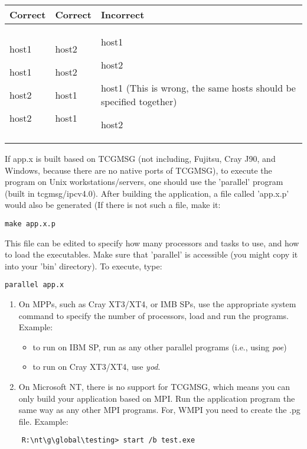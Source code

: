 \begin{tabular}{|>{\centering}p{2cm}|>{\centering}p{2cm}|>{\raggedright}p{3cm}|}
\hline 
Correct & Correct & Incorrect\tabularnewline
\hline
\hline 
host1

host1

host2

host2 & host2

host2

host1

host1 & host1

host2

host1 (This is wrong, the same hosts should be specified together)

host2\tabularnewline
\hline
\end{tabular}

If app.x is built based on TCGMSG (not including, Fujitsu, Cray J90,
and Windows, because there are no native ports of TCGMSG), to execute
the program on Unix workstations/servers, one should use the 'parallel'
program (built in tcgmsg/ipcv4.0). After building the application,
a file called 'app.x.p' would also be generated (If there is not such
a file, make it: 
\begin{verbatim}
make app.x.p
\end{verbatim}
This file can be edited to specify how many processors and tasks to
use, and how to load the executables. Make sure that 'parallel' is
accessible (you might copy it into your 'bin' directory). To execute,
type:
\begin{verbatim}
parallel app.x
\end{verbatim}
\begin{enumerate}
\item On MPPs, such as Cray XT3/XT4, or IMB SPs, use the appropriate system
command to specify the number of processors, load and run the programs.
Example: 

\begin{itemize}
\item to run on IBM SP, run as any other parallel programs (i.e., using
\emph{poe}) 
\item to run on Cray XT3/XT4, use \emph{yod}.
\end{itemize}
\item On Microsoft NT, there is no support for TCGMSG, which means you can
only build your application based on MPI. Run the application program
the same way as any other MPI programs. For, WMPI you need to create
the .pg file. Example: \end{enumerate}
\begin{verbatim}
    R:\nt\g\global\testing> start /b test.exe
\end{verbatim}

